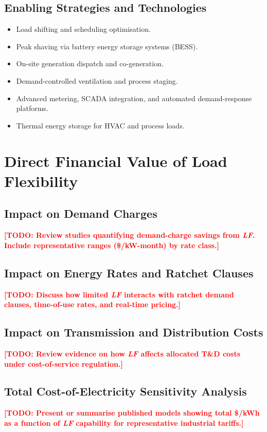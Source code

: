 \documentclass[12pt, a4paper, twocolumn]{article}
\newcommand{\LF}{\textit{LF}}
\newcommand{\TODO}[1]{\textcolor{red}{\textbf{[TODO: #1]}}}
\begin{document}
\subsection{Enabling Strategies and Technologies}
\begin{itemize}[nosep]
  \item Load shifting and scheduling optimisation.
  \item Peak shaving via battery energy storage systems (BESS).
  \item On-site generation dispatch and co-generation.
  \item Demand-controlled ventilation and process staging.
  \item Advanced metering, SCADA integration, and automated demand-response platforms.
  \item Thermal energy storage for HVAC and process loads.
\end{itemize}


\section{Direct Financial Value of Load Flexibility}
\label{sec:direct-value}

\subsection{Impact on Demand Charges}
\TODO{Review studies quantifying demand-charge savings from \LF{}.  Include representative ranges (\$/kW-month) by rate class.}

\subsection{Impact on Energy Rates and Ratchet Clauses}
\TODO{Discuss how limited \LF{} interacts with ratchet demand clauses, time-of-use rates, and real-time pricing.}

\subsection{Impact on Transmission and Distribution Costs}
\TODO{Review evidence on how \LF{} affects allocated T\&D costs under cost-of-service regulation.}

\subsection{Total Cost-of-Electricity Sensitivity Analysis}
\TODO{Present or summarise published models showing total \$/kWh as a function of \LF{} capability for representative industrial tariffs.}
\end{document}
